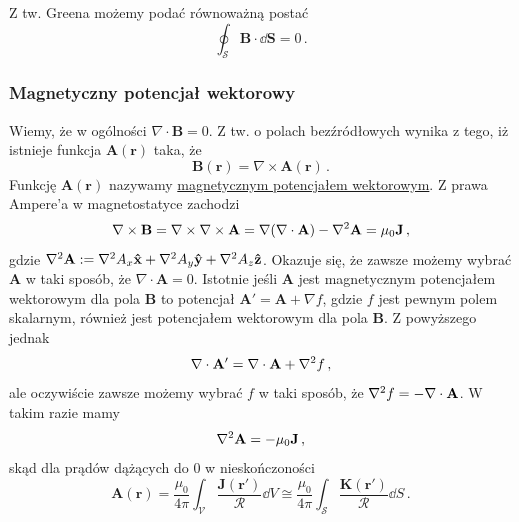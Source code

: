 \documentclass[../main.tex]{subfiles}
\begin{document}
Z tw. Greena możemy podać równoważną postać
\begin{equation*}
    \oint_\mathcal{S}\mathbf{B}\cdot\dd{\mathbf{S}}=0\,.
\end{equation*}


\subsubsection{Magnetyczny potencjał wektorowy}
Wiemy, że w ogólności \(\nabla\cdot\mathbf{B}=0\). Z tw. o polach bezźródłowych wynika z tego, iż istnieje funkcja \(\mathbf{A}(\mathbf{r})\) taka, że
\begin{equation*}
    \mathbf{B}(\mathbf{r})=\nabla\times\mathbf{A}(\mathbf{r})\,.
\end{equation*}
Funkcję \(\mathbf{A}(\mathbf{r})\) nazywamy \underline{magnetycznym potencjałem wektorowym}. Z prawa Ampere'a w magnetostatyce zachodzi
\begin{equation*}
    \nabla\times\mathbf{B}=\nabla\times\nabla\times\mathbf{A}=\nabla(\nabla\cdot\mathbf{A})-\laplacian\mathbf{A}=\mu_0\mathbf{J}\,,
\end{equation*}
gdzie \(\laplacian\mathbf{A}:=\laplacian A_x\mathbf{\hat{x}}+\laplacian A_y\mathbf{\hat{y}}+\laplacian A_z\mathbf{\hat{z}}\). Okazuje się, że zawsze możemy wybrać \(\mathbf{A}\) w taki sposób, że \(\nabla\cdot\mathbf{A}=0\). Istotnie jeśli \(\mathbf{A}\) jest magnetycznym potencjałem wektorowym dla pola \(\mathbf{B}\) to potencjał \(\mathbf{A}'=\mathbf{A}+\nabla f\), gdzie \(f\) jest pewnym polem skalarnym, również jest potencjałem wektorowym dla pola \(\mathbf{B}\). Z powyższego jednak
\begin{equation*}
    \nabla\cdot\mathbf{A}'=\nabla\cdot\mathbf{A}+\laplacian f\,,
\end{equation*}
ale oczywiście zawsze możemy wybrać \(f\) w taki sposób, że \(\laplacian f=-\nabla\cdot\mathbf{A}\). W takim razie mamy
\begin{equation*}
    \laplacian\mathbf{A}=-\mu_0\mathbf{J}\,,
\end{equation*}
skąd dla prądów dążących do 0 w nieskończoności
\begin{equation*}
    \mathbf{A}(\mathbf{r})=\frac{\mu_0}{4\pi}\int_\mathcal{V}\frac{\mathbf{J}(\mathbf{r}')}{\mathcal{R}}\dd{V}\cong\frac{\mu_0}{4\pi}\int_\mathcal{S}\frac{\mathbf{K}(\mathbf{r}')}{\mathcal{R}}\dd{S}\,.
\end{equation*}
\end{document}
